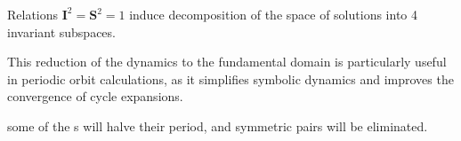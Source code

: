 Relations $\mathbf{I}^2=\mathbf{S}^2=1$
induce decomposition of the space of solutions into 4 invariant
subspaces.

This reduction of the dynamics to the fundamental domain is particularly
useful in periodic orbit calculations, as it simplifies symbolic dynamics
and improves the convergence of cycle expansions\cite{CvitaEckardt}.

some of the \po s will
halve their period, and symmetric pairs will be eliminated.



